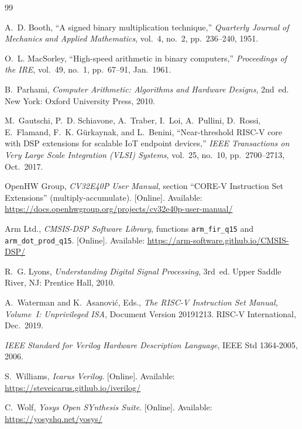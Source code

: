\documentclass[11pt,a4paper]{report}
\newcommand{\code}[1]{\texttt{#1}}
\begin{document}
\begin{thebibliography}{99}

A.~D. Booth, ``A signed binary multiplication technique,''
\emph{Quarterly Journal of Mechanics and Applied Mathematics}, vol.~4, no.~2,
pp.~236--240, 1951.

O.~L. MacSorley, ``High-speed arithmetic in binary computers,''
\emph{Proceedings of the IRE}, vol.~49, no.~1, pp.~67--91, Jan.~1961.

B.~Parhami, \emph{Computer Arithmetic: Algorithms and Hardware Designs},
2nd~ed. New York: Oxford University Press, 2010.

M.~Gautschi, P.~D. Schiavone, A.~Traber, I.~Loi, A.~Pullini, D.~Rossi,
E.~Flamand, F.~K. G\"urkaynak, and L.~Benini, ``Near-threshold RISC-V core with
DSP extensions for scalable IoT endpoint devices,''
\emph{IEEE Transactions on Very Large Scale Integration (VLSI) Systems},
vol.~25, no.~10, pp.~2700--2713, Oct.~2017.

OpenHW Group, \emph{CV32E40P User Manual}, section ``CORE-V Instruction Set
Extensions'' (multiply-accumulate). [Online]. Available:
\url{https://docs.openhwgroup.org/projects/cv32e40p-user-manual/}

Arm Ltd., \emph{CMSIS-DSP Software Library}, functions \code{arm\_fir\_q15}
and \code{arm\_dot\_prod\_q15}. [Online]. Available:
\url{https://arm-software.github.io/CMSIS-DSP/}

R.~G. Lyons, \emph{Understanding Digital Signal Processing}, 3rd~ed.
Upper Saddle River, NJ: Prentice Hall, 2010.

A.~Waterman and K.~Asanovi\'c, Eds., \emph{The RISC-V Instruction Set Manual,
Volume~I: Unprivileged ISA}, Document Version 20191213. RISC-V International,
Dec.~2019.

\emph{IEEE Standard for Verilog Hardware Description Language},
IEEE Std 1364-2005, 2006.

S.~Williams, \emph{Icarus Verilog}. [Online]. Available:
\url{https://steveicarus.github.io/iverilog/}

C.~Wolf, \emph{Yosys Open SYnthesis Suite}. [Online]. Available:
\url{https://yosyshq.net/yosys/}


\end{thebibliography}
\end{document}
